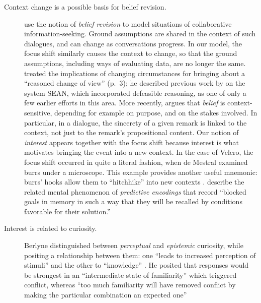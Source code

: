 \begin{description}                      
\item[Context change is a possible basis for belief revision.]
  \citet{logan1994modelling} use the notion of \emph{belief revision}
  to model situations of collaborative information-seeking.  Ground
  assumptions are shared in the context of such dialogues, and can
  change as conversations progress.  In our model, the focus shift
  similarly causes the context to change, so that the ground
  assumptions, including ways of evaluating data, are no longer the
  same.  \citet{harman1986change}
  treated the implications of changing circumstances for bringing
  about a ``reasoned change of view'' (p.~3); he described
  previous work by \citet{Doyle:1980:MDA:889488} 
  on the system {\sf SEAN}, which incorporated defeasible reasoning,
  as one of only a few earlier efforts in this area.
  More recently, \citet{clarke2017assertion} argues that \emph{belief} is
  context-sensitive, depending for example on purpose, and on the
  stakes involved.  In particular, in a dialogue, the sincerety of a
  given remark is linked to the context, not just to the remark's
  propositional content.  Our notion of \emph{interest} appears
  together with the focus shift because interest is what motivates bringing
  the event into a new context.  In the case of
  Velcro\textsuperscript{\texttrademark}, the focus shift occurred in
  quite a literal fashion, when de Mestral examined burrs under a
  microscope.  This example provides another useful mnemonic: burrs'
  hooks allow them to ``hitchhike'' into new contexts
  \cite[]{jenkins2011bio}.  
  \citet{patalano1993predictive} describe the related mental phenomenon of
  \emph{predictive encodings} that record ``blocked goals in memory in such a
  way that they will be recalled by conditions favorable for their
  solution.''
\item[Interest is related to curiosity.]  Berlyne distinguished
  between \emph{perceptual} and \emph{epistemic} curiosity, while
  positing a relationship between them: one ``leads to increased
  perception of stimuli'' and the other to ``knowledge''
  \cite[p.~180]{berlyne1954theory}.  He posited that responses would
  be strongest in an ``intermediate state of familiarity'' which
  triggered conflict, whereas ``too much familiarity will have removed
  conflict by making the particular combination an expected one''

\end{description}
